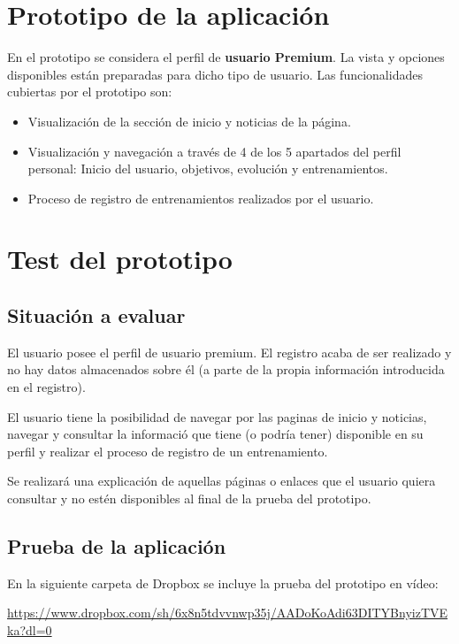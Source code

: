 \documentclass[a4paper]{article}
\begin{document}
\section{Prototipo de la aplicación}

En el prototipo se considera el perfil de \textbf{usuario Premium}. La vista y opciones disponibles están preparadas para dicho tipo de usuario. Las funcionalidades cubiertas por el prototipo son:

	\begin{itemize}
		\item	Visualización de la sección de inicio y noticias de la página.
		\item	Visualización y navegación a través de 4 de los 5 apartados del perfil personal: Inicio del usuario, objetivos, evolución y  entrenamientos.
		\item	Proceso de registro de entrenamientos realizados por el usuario.
	\end{itemize}
	

\section{Test del prototipo}

\subsection{Situación a evaluar}

El usuario posee el perfil de usuario premium. El registro acaba de ser realizado y no hay datos almacenados sobre él (a parte de la propia información introducida en el registro).

El usuario tiene la posibilidad de navegar por las paginas de inicio y noticias, navegar y consultar la informació que tiene (o podría tener) disponible en su perfil y realizar el proceso de registro de un entrenamiento.

Se realizará una explicación de aquellas páginas o enlaces que el usuario quiera consultar y no estén disponibles al final de la prueba del prototipo.

\subsection{Prueba de la aplicación}

En la siguiente carpeta de Dropbox se incluye la prueba del prototipo en vídeo:

\url{https://www.dropbox.com/sh/6x8n5tdvvnwp35j/AADoKoAdi63DITYBnyizTVEka?dl=0}
\end{document}
